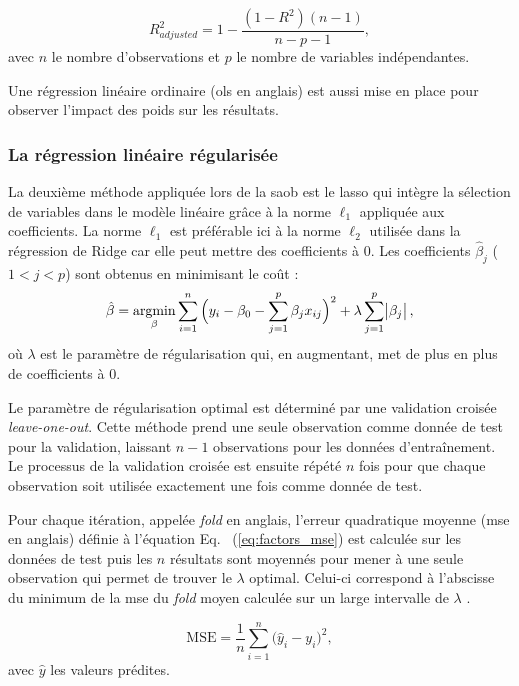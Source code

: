 \begin{equation}
\label{eq:factors_adjusted_R_squared}
R^2_{adjusted} = 1 - \frac{ (1 - R^2) (n - 1) }{ n - p - 1 }, 
\end{equation}
avec $n$ le nombre d'observations et $p$ le nombre de variables indépendantes.


Une régression linéaire ordinaire (\gls{ols} en anglais) est aussi mise en place pour observer l'impact des poids sur les résultats. 

\subsubsection{La régression linéaire régularisée}

La deuxième méthode appliquée lors de la \gls{saob} est le \gls{lasso} qui intègre la sélection de variables dans le modèle linéaire grâce à la norme $\ell_1$ appliquée aux coefficients.
La norme $\ell_1$ est préférable ici à la norme $\ell_2$ utilisée dans la régression de Ridge \citep{James2013} car elle peut mettre des coefficients à 0. 
Les coefficients $\hat{\beta}_{j}$ ($1<j<p$) sont obtenus en minimisant le coût :
\begin{equation}
\label{eq:factors_lasso-minimization}
\hat{\beta} = \operatorname*{argmin}_\beta \sum_{i=1}^{n} \Big(y_i - \beta_{0} - \sum_{j=1}^{p}\beta_{j}x_{ij}\Big)^2 + \lambda \sum_{j=1}^{p}\abs{\beta_{j}},
\end{equation} 
où $\lambda$ est le paramètre de régularisation qui, en augmentant, met de plus en plus de coefficients à 0. 

Le paramètre de régularisation optimal est déterminé par une validation croisée \textit{leave-one-out}. Cette méthode prend une seule observation 
comme donnée de test pour la validation, laissant $n - 1$ observations pour les données d'entraînement. Le processus de la validation croisée est 
ensuite répété $n$ fois pour que chaque observation soit utilisée exactement une fois comme donnée de test. 

Pour chaque itération, appelée \textit{fold} en anglais, l'erreur quadratique moyenne (\gls{mse} en anglais) définie à l'équation Eq.
~(\ref{eq:factors_mse}) est calculée sur les données de test
puis les $n$ résultats sont moyennés pour mener à une seule observation qui permet de trouver le $\lambda$ optimal. Celui-ci correspond à l'abscisse du minimum de la \gls{mse} 
du \textit{fold} moyen calculée sur un large intervalle de $\lambda$ \citep{James2013}. 

\begin{equation}
\label{eq:factors_mse}
\text{MSE} = \frac{1}{n}\sum_{i=1}^{n} \Big(\hat{y}_i - {y}_i\Big)^2,
\end{equation}
avec $\hat{y}$ les valeurs prédites.

